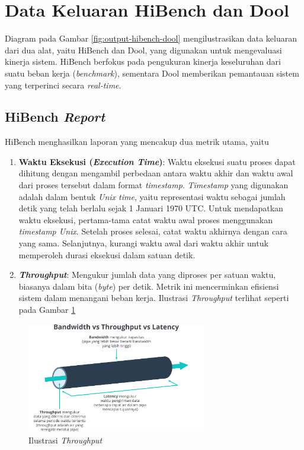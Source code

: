 \section{Data Keluaran HiBench dan Dool}
Diagram pada Gambar \ref{fig:output-hibench-dool} mengilustrasikan data keluaran dari dua alat, yaitu HiBench dan Dool, yang digunakan untuk mengevaluasi kinerja sistem. HiBench berfokus pada pengukuran kinerja keseluruhan dari suatu beban kerja (\textit{benchmark}), sementara Dool memberikan pemantauan sistem yang terperinci secara \textit{real-time}.

\subsection{HiBench \textit{Report}}
HiBench menghasilkan laporan yang mencakup dua metrik utama, yaitu
\begin{enumerate}
	\item \textbf{Waktu Eksekusi (\textit{Execution Time})}: Waktu eksekusi suatu proses dapat dihitung dengan mengambil perbedaan antara waktu akhir dan waktu awal dari proses tersebut dalam format \textit{timestamp}. \textit{Timestamp} yang digunakan adalah dalam bentuk \textit{Unix time}, yaitu representasi waktu sebagai jumlah detik yang telah berlalu sejak 1 Januari 1970 UTC. Untuk mendapatkan waktu eksekusi, pertama-tama catat waktu awal proses menggunakan \textit{timestamp Unix}. Setelah proses selesai, catat waktu akhirnya dengan cara yang sama. Selanjutnya, kurangi waktu awal dari waktu akhir untuk memperoleh durasi eksekusi dalam satuan detik.
	\item \textbf{\textit{Throughput}}: Mengukur jumlah data yang diproses per satuan waktu, biasanya dalam bita (\textit{byte}) per detik. Metrik ini mencerminkan efisiensi sistem dalam menangani beban kerja. Ilustrasi \textit{Throughput} terlihat seperti pada Gambar \ref{fig:ilustrasi-throughput}
\end{enumerate}

\begin{figure}[h]
    \centering
    \includegraphics[width=0.7\textwidth]{figures/ch02/ilustrasi-lalu-lintas-jaringan.png}
    \caption{Ilustrasi \textit{Throughput} \cite{PenjelasanApaItu2023}}
    \label{fig:ilustrasi-throughput}
\end{figure}



